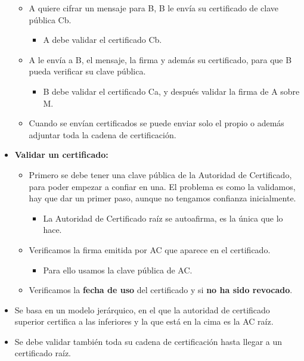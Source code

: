 \documentclass[12pt, twoside, openright]{report} %
\begin{document}
\begin{itemize}
    \begin{itemize}
    \item A quiere cifrar un mensaje para B, B le envía su certificado de
      clave pública Cb.
      

      \begin{itemize}
      \item A debe validar el certificado Cb.
        
      \end{itemize}
    \item A le envía a B, el mensaje, la firma y además su certificado, para
      que B pueda verificar su clave pública.
      

      \begin{itemize}
      \item B debe validar el certificado Ca, y después validar la firma de
        A sobre M.
        
      \end{itemize}
    \item Cuando se envían certificados se puede enviar solo el propio o
      además adjuntar toda la cadena de certificación.
      
    \end{itemize}
  \item \textbf{Validar un certificado:}
    

    \begin{itemize}
    \item Primero se debe tener una clave pública de la Autoridad de
      Certificado, para poder empezar a confiar en una. El problema es
      como la validamos, hay que dar un primer paso, aunque no tengamos
      confianza inicialmente.
      

      \begin{itemize}
      \item La Autoridad de Certificado raíz se autoafirma, es la única que
        lo hace.
        
      \end{itemize}
    \item Verificamos la firma emitida por AC que aparece en el certificado.
      

      \begin{itemize}
      \item Para ello usamos la clave pública de AC.
        
      \end{itemize}
    \item Verificamos la \textbf{fecha de uso} del certificado y si
      \textbf{no ha sido revocado}.
      
    \end{itemize}
  \item Se basa en un modelo jerárquico, en el que la autoridad de
    certificado superior certifica a las inferiores y la que está en la
    cima es la AC raíz.
    
  \item Se debe validar también toda su cadena de certificación hasta llegar
    a un certificado raíz.
    
  \end{itemize}
\end{document}
